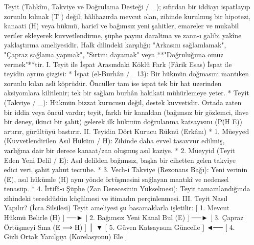 \documentclass[11pt,a4paper]{article}
\begin{document}
Teyit (Tahkîm, Takviye ve Doğrulama Desteği / _{}); sıfırdan bir iddiayı ispatlayıp zorunlu kılmak (T ) değil; hâlihazırda mevcut olan, zihinde kurulmuş bir hipotezi, kanaati (H) veya hükmü, haricî ve bağımsız yeni şahitler, emareler ve mukabil veriler ekleyerek kuvvetlendirme, şüphe payını daraltma ve zann-ı gālibi yakîne yaklaştırma ameliyesidir.
Halk dilindeki karşılığı: "Arkasını sağlamlamak", "Çapraz sağlama yapmak", "Sırtını dayamak" veya **"Doğruluğuna omuz vermek"**tir.
I. Teyit ile İspat Arasındaki Köklü Fark (Fârik Esas)
İspat ile teyidin ayrım çizgisi:
 * İspat (el-Burhân / _{13}): Bir hükmün doğmasını mantıken zorunlu kılan asli köprüdür. Öncüller tam ise ispat tek bir hat üzerinden aksiyomlara kilitlenir; tek bir sağlam burhân hakikati mühürlemeye yeter.
 * Teyit (Takviye / _{}): Hükmün bizzat kurucusu değil, destek kuvvetidir. Ortada zaten bir iddia veya öncül vardır; teyit, farklı bir kanaldan (bağımsız bir gözlemci, ilave bir deney, ikinci bir şahit) gelerek ilk hükmün doğrulanma katsayısını (P(H \mid E)) artırır, gürültüyü bastırır.
II. Teyidin Dört Kurucu Rüknü (Erkânı)
 * 1. Müeyyed (Kuvvetlendirilen Asıl Hüküm / H): Zihinde daha evvel tasavvur edilmiş, varlığına dair bir derece kanaat/zan oluşmuş asıl kaziye.
 * 2. Müeyyid (Teyit Eden Yeni Delil / E): Asıl delilden bağımsız, başka bir cihetten gelen takviye edici veri, şahit yahut tecrübe.
 * 3. Vech-i Takviye (Rezonans Bağı): Yeni verinin (E), asıl hükümle (H) aynı yönde örtüşmesini sağlayan mantıkî ve nedensel tenasüp.
 * 4. İrtifâ-ı Şüphe (Zan Derecesinin Yükselmesi): Teyit tamamlandığında zihindeki tereddüdün küçülmesi ve itimadın perçinlenmesi.
III. Teyit Nasıl Yapılır? (İcra Silsilesi)
Teyit ameliyesi şu basamaklarla işletilir:
[ 1. Mevcut Hükmü Belirle (H) ] ──► [ 2. Bağımsız Yeni Kanal Bul (E) ] ──► [ 3. Çapraz Örtüşmeyi Sına (E ⟹ H) ]
                                                                                         │
                                                                                         ▼
[ 5. Güven Katsayısını Güncelle ] ◄── [ 4. Gizli Ortak Yanılgıyı (Korelasyonu) Ele ]
\end{document}
